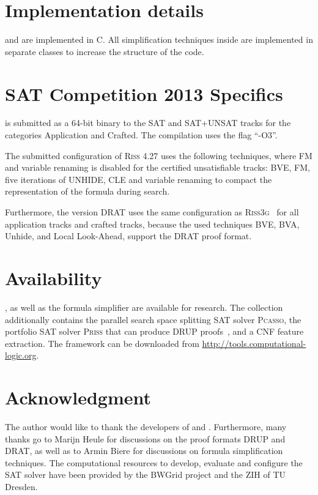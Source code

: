 \documentclass[conference]{IEEEtran}
\def\CC{{C\nolinebreak[4]\hspace{-.05em}\raisebox{.4ex}{\tiny\bf ++}}}
\begin{document}
\section{Implementation details}

\riss and \coprocessor are implemented in \CC. 
All simplification techniques inside \coprocessor are implemented in separate classes to increase the structure of the code. 
 
\section{SAT Competition 2013 Specifics}

\riss is submitted as a 64-bit binary to the SAT and SAT+UNSAT tracks for the categories Application and Crafted. 
The compilation uses the flag ``-O3''. 

The submitted configuration of \textsc{Riss 4.27} uses the following techniques, where FM and variable renaming is disabled for the certified unsatisfiable tracks:
%
BVE, 
FM, 
five iterations of UNHIDE,
CLE 
and variable renaming to compact the representation of the formula during search. 

Furthermore, the version \textsc{DRAT} uses the same configuration as \textsc{Riss3g}~\cite{riss3g} for all application tracks and crafted tracks, because the used techniques 
BVE, BVA, Unhide, and Local Look-Ahead, support the DRAT proof format. 

\section{Availability}

\riss, as well as the formula simplifier \coprocessor are available  for research. 
The collection additionally contains the parallel search space splitting SAT solver \textsc{Pcasso}, 
the portfolio SAT solver \textsc{Priss} that can produce DRUP proofs~\cite{HeuleMP:2014}, 
and a CNF feature extraction.
The framework can be downloaded from \url{http://tools.computational-logic.org}.

\section*{Acknowledgment}
The author would like to thank the developers of \glucose and \minisat. 
Furthermore, many thanks go to Marijn Heule for discussions on the proof formats DRUP and DRAT, as well as to Armin Biere for discussions on formula simplification techniques. 
The computational resources to develop, evaluate and configure the SAT solver have been provided by the BWGrid \cite{bwgrid} project and the ZIH of TU Dresden. 
\end{document}
